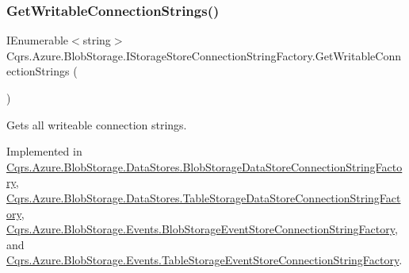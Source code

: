 \mbox{\label{interfaceCqrs_1_1Azure_1_1BlobStorage_1_1IStorageStoreConnectionStringFactory_a26ecfd0805fe3d525e9fa419330bd140_a26ecfd0805fe3d525e9fa419330bd140}} 
\subsubsection{\texorpdfstring{Get\+Writable\+Connection\+Strings()}{GetWritableConnectionStrings()}}
{\footnotesize\ttfamily I\+Enumerable$<$string$>$ Cqrs.\+Azure.\+Blob\+Storage.\+I\+Storage\+Store\+Connection\+String\+Factory.\+Get\+Writable\+Connection\+Strings (\begin{DoxyParamCaption}{ }\end{DoxyParamCaption})}



Gets all writeable connection strings. 



Implemented in \hyperlink{classCqrs_1_1Azure_1_1BlobStorage_1_1DataStores_1_1BlobStorageDataStoreConnectionStringFactory_a71b549351646fd4261b3f52f264759f4_a71b549351646fd4261b3f52f264759f4}{Cqrs.\+Azure.\+Blob\+Storage.\+Data\+Stores.\+Blob\+Storage\+Data\+Store\+Connection\+String\+Factory}, \hyperlink{classCqrs_1_1Azure_1_1BlobStorage_1_1DataStores_1_1TableStorageDataStoreConnectionStringFactory_a65b6f404ac2434c6366af73a22e914d1_a65b6f404ac2434c6366af73a22e914d1}{Cqrs.\+Azure.\+Blob\+Storage.\+Data\+Stores.\+Table\+Storage\+Data\+Store\+Connection\+String\+Factory}, \hyperlink{classCqrs_1_1Azure_1_1BlobStorage_1_1Events_1_1BlobStorageEventStoreConnectionStringFactory_a002b45d6a893b1b3024b0e7c97f1c9ac_a002b45d6a893b1b3024b0e7c97f1c9ac}{Cqrs.\+Azure.\+Blob\+Storage.\+Events.\+Blob\+Storage\+Event\+Store\+Connection\+String\+Factory}, and \hyperlink{classCqrs_1_1Azure_1_1BlobStorage_1_1Events_1_1TableStorageEventStoreConnectionStringFactory_a07406c2607bdd42dd13116b92fc6b665_a07406c2607bdd42dd13116b92fc6b665}{Cqrs.\+Azure.\+Blob\+Storage.\+Events.\+Table\+Storage\+Event\+Store\+Connection\+String\+Factory}.

